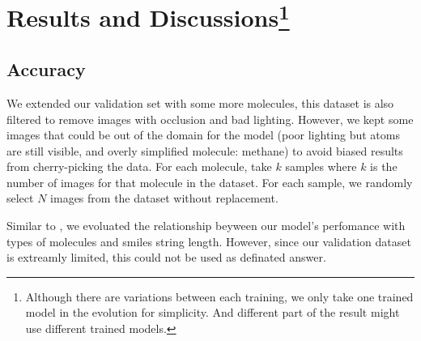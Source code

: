 \documentclass[12pt]{article}
\begin{document}
\section[Results and Discussions]{Results and Discussions\footnote{Although there are variations between each training, we only take one trained model in the evolution for simplicity. And different part of the result might use different trained models. }}
\subsection{Accuracy}
We extended our validation set with some more molecules, this dataset is also filtered to remove images with occlusion and bad lighting. However, we kept some images that could be out of the domain for the model (poor lighting but atoms are still visible, and overly simplified molecule: methane) to avoid biased results from cherry-picking the data. For each molecule, take $k$ samples where $k$ is the number of images for that molecule in the dataset. For each sample, we randomly select $N$ images from the dataset without replacement. 

Similar to \cite{swinocsr}, we evoluated the relationship beyween our model's perfomance with types of molecules and smiles string length. However, since our validation dataset is extreamly limited, this could not be used as definated answer. 





\end{document}
